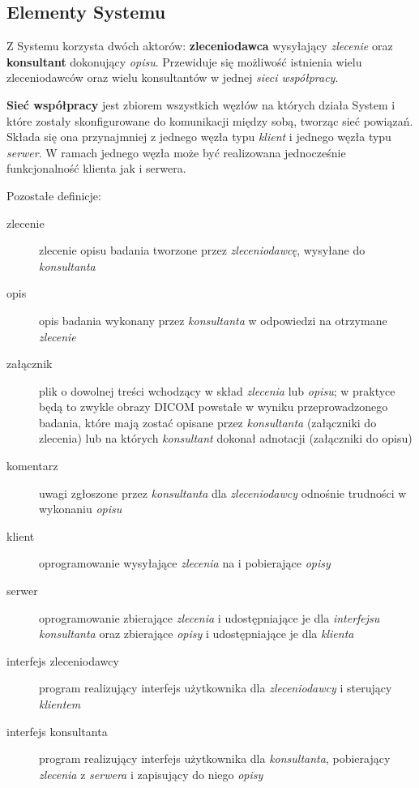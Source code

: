 \documentclass[a4paper]{article}
\begin{document}
\subsection{Elementy Systemu}

Z Systemu korzysta dwóch aktorów: \textbf{zleceniodawca} wysyłający \emph{zlecenie}
oraz \textbf{konsultant} dokonujący \emph{opisu}. Przewiduje się możliwość
istnienia wielu zleceniodawców oraz wielu konsultantów w jednej \emph{sieci
współpracy}.

\textbf{Sieć współpracy} jest zbiorem wszystkich węzłów na których działa System i które
zostały skonfigurowane do komunikacji między sobą, tworząc sieć powiązań. Składa
się ona przynajmniej z jednego węzła typu \emph{klient} i jednego węzła typu \emph{serwer}.
W ramach jednego węzła może być realizowana jednocześnie funkcjonalność
klienta jak i serwera.

Pozostałe definicje:
\begin{description}
  \item[zlecenie] zlecenie opisu badania tworzone przez \emph{zleceniodawcę}, wysyłane do
  \emph{konsultanta}
  \item[opis] opis badania wykonany przez \emph{konsultanta} w odpowiedzi na otrzymane
  \emph{zlecenie}
  \item[załącznik] plik o dowolnej treści wchodzący w skład \emph{zlecenia} lub
  \emph{opisu}; w praktyce będą to zwykle obrazy DICOM powstałe w wyniku przeprowadzonego
  badania, które mają zostać opisane przez \emph{konsultanta} (załączniki do zlecenia) lub
  na których \emph{konsultant} dokonał adnotacji (załączniki do opisu)
  \item[komentarz] uwagi zgłoszone przez \emph{konsultanta} dla \emph{zleceniodawcy}
  odnośnie trudności w wykonaniu \emph{opisu}
  \item[klient] oprogramowanie wysyłające \emph{zlecenia} na  i pobierające
  \emph{opisy}
  \item[serwer] oprogramowanie zbierające \emph{zlecenia} i udostępniające je dla
  \emph{interfejsu konsultanta} oraz zbierające \emph{opisy} i udostępniające je dla
  \emph{klienta}
  \item[interfejs zleceniodawcy] program realizujący interfejs użytkownika dla
  \emph{zleceniodawcy} i sterujący \emph{klientem}
  \item[interfejs konsultanta] program realizujący interfejs użytkownika dla
  \emph{konsultanta}, pobierający \emph{zlecenia} z \emph{serwera} i zapisujący do niego
  \emph{opisy}
\end{description}
\end{document}
